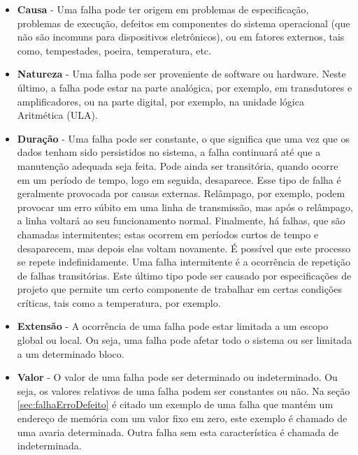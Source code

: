 \begin{itemize}
	\item \textbf{Causa} - Uma falha pode ter origem em problemas de especificação, problemas de execução, defeitos em componentes do sistema operacional (que não são incomuns para dispositivos eletrônicos), ou em fatores externos, tais como, tempestades, poeira, temperatura, etc.
	
	\item \textbf{Natureza} - Uma falha pode ser proveniente de software ou hardware. Neste último, a falha pode estar na parte analógica, por exemplo, em transdutores e amplificadores, ou na parte digital, por exemplo, na unidade lógica Aritmética (ULA).
	
	\item \textbf{Duração} - Uma falha pode ser constante, o que significa que uma vez que os dados tenham sido persistidos no sistema, a falha continuará até que a manutenção adequada seja feita. Pode ainda ser transitória, quando ocorre em um período de tempo, logo em seguida, desaparece. Esse tipo de falha é geralmente provocada por causas externas. Relâmpago, por exemplo, podem provocar um erro súbito em uma linha de transmissão, mas após o relâmpago, a linha voltará ao seu funcionamento normal. Finalmente, há falhas, que são chamadas intermitentes; estas ocorrem em períodos curtos de tempo e desaparecem, mas depois elas voltam novamente. É possível que este processo se repete indefinidamente. Uma falha intermitente é a ocorrência de repetição de falhas transitórias. Este último tipo pode ser causado por especificações de projeto que permite um certo componente de trabalhar em certas condições críticas, tais como a temperatura, por exemplo.
	
	\item \textbf{Extensão} - A ocorrência de uma falha pode estar limitada a um escopo global ou local. Ou seja, uma falha pode afetar todo o sistema ou ser limitada a um determinado bloco. 
	
	\item \textbf{Valor} - O valor de uma falha pode ser determinado ou indeterminado. Ou seja, os valores relativos de uma falha podem ser constantes ou não. Na seção \ref{sec:falhaErroDefeito} é citado um exemplo de uma falha que mantém um endereço de memória com um valor fixo em zero, este exemplo é chamado de uma avaria determinada. Outra falha sem esta característica é chamada de indeterminada.
	
	
	
\end{itemize}


